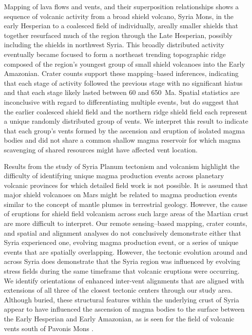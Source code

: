 Mapping of lava flows and vents, and their superposition relationships shows a sequence of volcanic activity from a broad shield volcano, Syria Mons, in the early Hesperian to a coalesced field of individually, areally smaller shields that together resurfaced much of the region through the Late Hesperian, possibly including the shields in northwest Syria.  This broadly distributed activity eventually became focused to form a northeast trending topographic ridge composed of the region's youngest group of small shield volcanoes into the Early Amazonian. Crater counts support these mapping--based inferences, indicating that each stage of activity followed the previous stage with no significant hiatus and that each stage likely lasted between 60 and 650~Ma. Spatial statistics are inconclusive with regard to differentiating multiple events, but do suggest that the earlier coalesced shield field and the northern ridge shield field each represent a unique randomly distributed group of vents. We interpret this result to indicate that each group's vents formed by the ascension and eruption of isolated magma bodies and did not share a common shallow magma reservoir for which magma scavenging of shared resources might have affected vent location.

Results from the study of Syria Planum tectonism and volcanism highlight the difficulty of identifying unique magma production events across planetary volcanic provinces for which detailed field work is not possible.  It is assumed that major shield volcanoes on Mars might be related to magma production events similar to the concept of mantle plumes in terrestrial geology. However, the cause of eruptions for shield field volcanism across such large areas of the Martian crust are more difficult to interpret. Our remote sensing--based mapping, crater counts, and spatial and alignment analyses do not conclusively demonstrate either that Syria experienced one, evolving magma production event, or a series of unique events that are spatially overlapping.  However, the tectonic evolution around and across Syria does demonstrate that the Syria region was influenced by evolving stress fields during the same timeframe that volcanic eruptions were occurring. We identify orientations of enhanced inter-vent alignments that are aligned with extensions of all three of the closest tectonic centers through our study area.  Although buried, these structural features within the underlying crust of Syria appear to have influenced the ascension of magma bodies to the surface between the Early Hesperian and Early Amazonian, as is seen for the field of volcanic vents south of Pavonis Mons \citep{Bleacher2009}.

